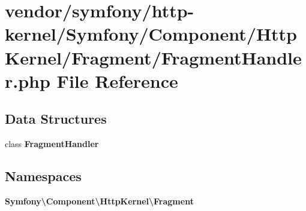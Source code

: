 \section{vendor/symfony/http-\/kernel/\+Symfony/\+Component/\+Http\+Kernel/\+Fragment/\+Fragment\+Handler.php File Reference}
\label{_fragment_handler_8php}
\subsection*{Data Structures}
\begin{DoxyCompactItemize}
\item 
class {\bf Fragment\+Handler}
\end{DoxyCompactItemize}
\subsection*{Namespaces}
\begin{DoxyCompactItemize}
\item 
 {\bf Symfony\textbackslash{}\+Component\textbackslash{}\+Http\+Kernel\textbackslash{}\+Fragment}
\end{DoxyCompactItemize}
